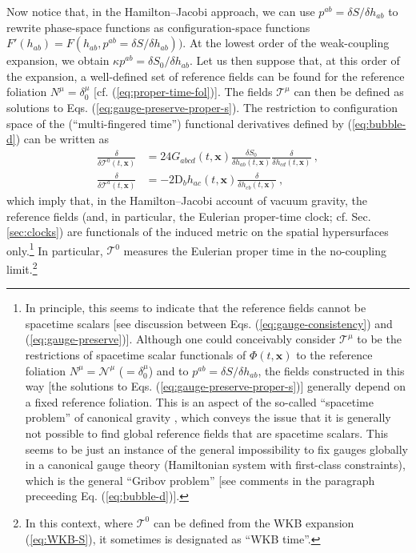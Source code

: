 \documentclass[12pt]{iopart}
\def\eq#1{\begin{equation}\begin{aligned}#1\end{aligned}\end{equation}}
\def\eref#1{(\ref{eq:#1})}
\def\x{\mathbf{x}}
\def\T{\mathcal{T}}
\begin{document}
Now notice that, in the Hamilton--Jacobi approach, we can use $p^{ab} = \delta S/\delta h_{ab}$ to rewrite phase-space functions as configuration-space functions $F'(h_{ab})=F(h_{ab},p^{ab}=\delta S/\delta h_{ab}))$. At the lowest order of the weak-coupling expansion, we obtain $\kappa p^{ab} = \delta S_0/\delta h_{ab}$.  Let us then suppose that, at this order of the expansion, a well-defined set of reference fields can be found for the reference foliation $N^{\mu}=\delta^{\mu}_0$ [cf. \eref{proper-time-fol}]. The fields $\mathcal{T}^{\mu}$ can then be defined as solutions to Eqs. \eref{gauge-preserve-proper-s}. The restriction to configuration space of the  (``multi-fingered time'') functional derivatives defined by \eref{bubble-d} can be written as
\eq{\label{eq:bubble-d-HJ}
\frac{\delta}{\delta\T^{0}(t,\x)} &= 24G_{abcd}(t,\x)\frac{\delta S_0}{\delta h_{ab}(t,\x)}\frac{\delta}{\delta h_{cd}(t,\x)}\ , \\
\frac{\delta}{\delta\T^{a}(t,\x)} &= -2\mathrm{D}_bh_{ac}(t,\x)\frac{\delta}{\delta h_{cb}(t,\x)}  \ , 
}
which imply that, in the Hamilton--Jacobi account of vacuum gravity, the reference fields (and, in particular, the Eulerian proper-time clock; cf. Sec. \ref{sec:clocks}) are functionals of the induced metric on the spatial hypersurfaces only.\footnote{In principle, this seems to indicate that the reference fields cannot be spacetime scalars [see discussion between Eqs. \eref{gauge-consistency} and \eref{gauge-preserve}]. Although one could conceivably consider $\mathcal{T}^{\mu}$ to be the restrictions of spacetime scalar functionals of $\Phi(t,\x)$ to the reference foliation $N^{\mu} = \mathcal{N}^{\mu}$ ($=\delta^{\mu}_0$) and to $p^{ab} = \delta S/\delta h_{ab}$, the fields constructed in this way [the solutions to Eqs. \eref{gauge-preserve-proper-s}] generally depend on a fixed reference foliation. This is an aspect of the so-called ``spacetime problem'' of canonical gravity \citep{Isham:1992ms,Kuchar:1991qf}, which conveys the issue that it is generally not possible to find global reference fields that are spacetime scalars. This seems to be just an instance of the general impossibility to fix gauges globally in a canonical gauge theory (Hamiltonian system with first-class constraints), which is the general ``Gribov problem'' \citep{HT:book} [see comments in the paragraph preceeding Eq. \eref{bubble-d}].} In particular, $\T^0$ measures the Eulerian proper time in the no-coupling limit.\footnote{In this context, where $\T^0$ can be defined from the WKB expansion \eref{WKB-S}, it sometimes is designated as ``WKB time''.}
\end{document}
